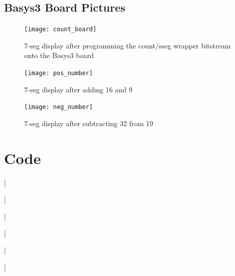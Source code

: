 \documentclass[11pt]{article}
\newcommand{\Verilog}[2][]{%
	
}
\begin{document}
\FloatBarrier

\subsection*{Basys3 Board Pictures}
\begin{figure}[ht]\centering
\texttt{[image: count\_board]}
	\caption{7-seg display after programming the count/sseg wrapper bitstream onto the Basys3 board}
	\label{fig:sim_with_table}
\end{figure}

\begin{figure}[ht]\centering
\texttt{[image: pos\_number]}
	\caption{7-seg display after adding 16 and 9}
	\label{fig:sim_with_table}
\end{figure}


\begin{figure}[ht]\centering
\texttt{[image: neg\_number]}
	\caption{7-seg display after subtracting 32 from 19}
	\label{fig:sim_with_table}
\end{figure}




\section*{Code}

\Verilog[firstline=22, lastline=41, caption=Counter Module Code]{Lab10_project/codedirectory/counter.sv}|

\Verilog[firstline=22, lastline=39, caption=Counter Test Module Code]{Lab10_project/codedirectory/counter_test.sv}|

\Verilog[firstline=22, lastline=48, caption=Counter 7-seg Module Code]{Lab10_project/codedirectory/count_sseg_wrapper.sv}|

\Verilog[firstline=22, lastline=51, caption=Show 2's Comp Module Code]{Lab10_project/codedirectory/show2c.sv}|

\Verilog[firstline=22, lastline=42, caption=Show 2's Comp Test Module Code]{Lab10_project/codedirectory/show2c_test.sv}|

\Verilog[firstline=22, lastline=67, caption=Top-Level Module Code]{Lab10_project/codedirectory/top_level.sv}|
\end{document}
